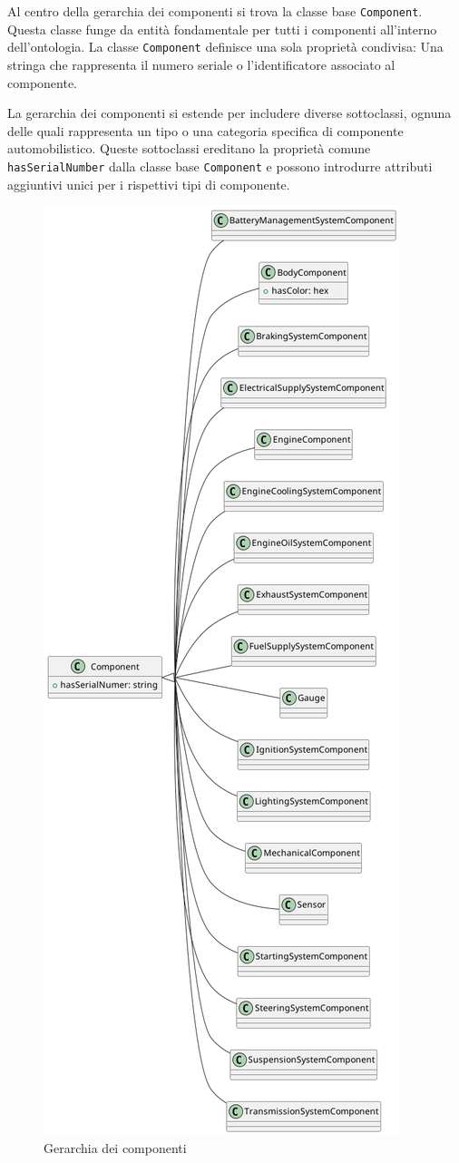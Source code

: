 Al centro della gerarchia dei componenti si trova la classe base \texttt{Component}. Questa classe funge da entità fondamentale per tutti i componenti all'interno dell'ontologia. La classe \texttt{Component} definisce una sola proprietà condivisa: Una stringa che rappresenta il numero seriale o l'identificatore associato al componente.

La gerarchia dei componenti si estende per includere diverse sottoclassi, ognuna delle quali rappresenta un tipo o una categoria specifica di componente automobilistico. Queste sottoclassi ereditano la proprietà comune \texttt{hasSerialNumber} dalla classe base \texttt{Component} e possono introdurre attributi aggiuntivi unici per i rispettivi tipi di componente.

\begin{figure}[H]
    \caption{Gerarchia dei componenti}
    \includegraphics[height=\textheight]{figures/carpedia-component.png}

\end{figure}

